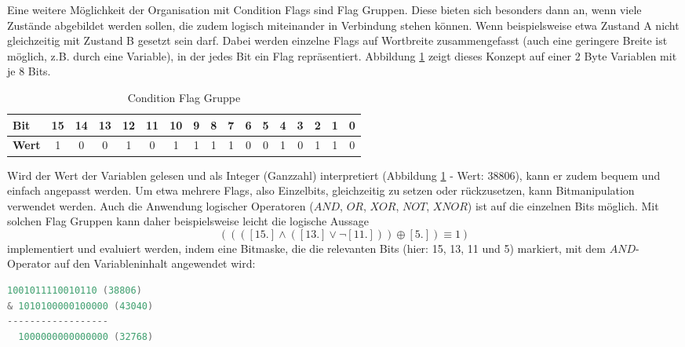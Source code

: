 \documentclass{llncs}
\begin{document}
Eine weitere Möglichkeit der Organisation mit Condition Flags sind Flag Gruppen. Diese bieten sich besonders dann an, wenn viele Zustände abgebildet werden sollen, die zudem logisch miteinander in Verbindung stehen können. Wenn beispielsweise etwa Zustand A nicht gleichzeitig mit Zustand B gesetzt sein darf. Dabei werden einzelne Flags auf Wortbreite zusammengefasst (auch eine geringere Breite ist möglich, z.B. durch eine Variable), in der jedes Bit ein Flag repräsentiert. Abbildung \ref{tab:FlagGroup} zeigt dieses Konzept auf einer 2 Byte Variablen mit je 8 Bits.\\
\begin{table}[h]
	\centering %
	\def\arraystretch{1.5} %
	\setlength{\tabcolsep}{0.5em} %
		\begin{tabular}[h]{|l|c|c|c|c|c|c|c|c|c|c|c|c|c|c|c|c|}
			\hline
			\textbf{Bit} & \cellcolor{hellgrau}15 & \cellcolor{hellgrau}14 & \cellcolor{hellgrau}13 & \cellcolor{hellgrau}12 & \cellcolor{hellgrau}11 & \cellcolor{hellgrau}10 & \cellcolor{hellgrau}9 & \cellcolor{hellgrau}8 & \cellcolor{hellgrau}7 & \cellcolor{hellgrau}6 & \cellcolor{hellgrau}5 & \cellcolor{hellgrau}4 & \cellcolor{hellgrau}3 & \cellcolor{hellgrau}2 & \cellcolor{hellgrau}1 & \cellcolor{hellgrau}0 \\
			\hline
			\textbf{Wert} & 1 & 0 & 0 & 1 & 0 & 1 & 1 & 1 & 1 & 0 & 0 & 1 & 0 & 1 & 1 & 0 \\
			\hline
	\end{tabular}%
	\caption{\label{tab:FlagGroup} Condition Flag Gruppe \autocite[vgl.][85]{Cooling2017}}
\end{table}

Wird der Wert der Variablen gelesen und als Integer (Ganzzahl) interpretiert (Abbildung \ref{tab:FlagGroup} - Wert: $38806$), kann er zudem bequem und einfach angepasst werden. Um etwa mehrere Flags, also Einzelbits, gleichzeitig zu setzen oder rückzusetzen, kann Bitmanipulation verwendet werden. Auch die Anwendung logischer Operatoren ($AND$, $OR$, $XOR$, $NOT$, $XNOR$) ist auf die einzelnen Bits möglich. Mit solchen Flag Gruppen kann daher beispielsweise leicht die logische Aussage %
\begin{equation}
((([15.] \wedge ([13.] \vee \neg[11.]))\oplus [5.])\equiv 1)
\label{eq:ConditionFlagGroupEq}
\end{equation}
implementiert und evaluiert werden, indem eine Bitmaske, die die relevanten Bits (hier: 15, 13, 11 und 5) markiert, mit dem $AND$-Operator auf den Variableninhalt angewendet wird:
\lstset{basicstyle=\footnotesize, frame=tb, xleftmargin=.3\textwidth, xrightmargin=.3\textwidth}
\begin{lstlisting}[language=C]
  1001011110010110 (38806)
& 1010100000100000 (43040)
------------------
  1000000000000000 (32768)
\end{lstlisting}
\end{document}
